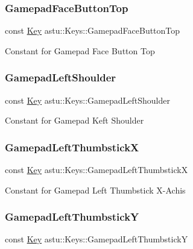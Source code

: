 \subsubsection{\texorpdfstring{Gamepad\+Face\+Button\+Top}{GamepadFaceButtonTop}}
{\footnotesize\ttfamily const \hyperlink{classastu_1_1Key}{Key} astu\+::\+Keys\+::\+Gamepad\+Face\+Button\+Top\hspace{0.3cm}{\ttfamily [static]}}

Constant for \textquotesingle{}Gamepad Face Button Top\textquotesingle{} \mbox{\label{classastu_1_1Keys_aa638ad98f82fbaa9b03b06f5303c1088}} 
\subsubsection{\texorpdfstring{Gamepad\+Left\+Shoulder}{GamepadLeftShoulder}}
{\footnotesize\ttfamily const \hyperlink{classastu_1_1Key}{Key} astu\+::\+Keys\+::\+Gamepad\+Left\+Shoulder\hspace{0.3cm}{\ttfamily [static]}}

Constant for \textquotesingle{}Gamepad Keft Shoulder\textquotesingle{} \mbox{\label{classastu_1_1Keys_ad2dbb4d3ee2bc68d4ddfd4fcc6a16553}} 
\subsubsection{\texorpdfstring{Gamepad\+Left\+ThumbstickX}{GamepadLeftThumbstickX}}
{\footnotesize\ttfamily const \hyperlink{classastu_1_1Key}{Key} astu\+::\+Keys\+::\+Gamepad\+Left\+ThumbstickX\hspace{0.3cm}{\ttfamily [static]}}

Constant for \textquotesingle{}Gamepad Left Thumbstick X-\/\+Achis\textquotesingle{} \mbox{\label{classastu_1_1Keys_aa605d32f30cfe84cb77c67ddd16a804e}} 
\subsubsection{\texorpdfstring{Gamepad\+Left\+ThumbstickY}{GamepadLeftThumbstickY}}
{\footnotesize\ttfamily const \hyperlink{classastu_1_1Key}{Key} astu\+::\+Keys\+::\+Gamepad\+Left\+ThumbstickY\hspace{0.3cm}{\ttfamily [static]}}

